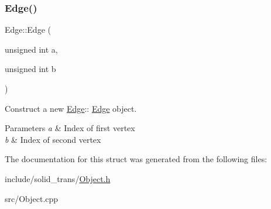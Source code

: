 \subsubsection{\texorpdfstring{Edge()}{Edge()}}
{\footnotesize\ttfamily Edge\+::\+Edge (\begin{DoxyParamCaption}\item[{unsigned int}]{a,  }\item[{unsigned int}]{b }\end{DoxyParamCaption})}



Construct a new \hyperlink{structEdge}{Edge}\+:\+: \hyperlink{structEdge}{Edge} object. 


\begin{DoxyParams}{Parameters}
{\em a} & Index of first vertex \\
\hline
{\em b} & Index of second vertex \\
\hline
\end{DoxyParams}


The documentation for this struct was generated from the following files\+:\begin{DoxyCompactItemize}
\item 
include/solid\+\_\+trans/\hyperlink{Object_8h}{Object.\+h}\item 
src/Object.\+cpp\end{DoxyCompactItemize}
